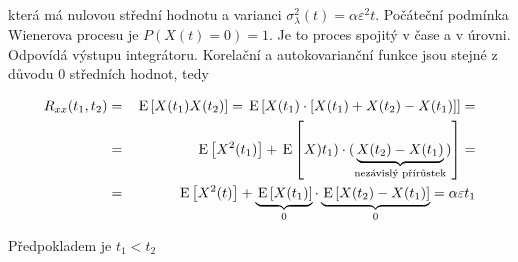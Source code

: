 která má nulovou střední hodnotu a varianci $\sigma^2_\lambda(t) = \alpha\varepsilon^2 t$. Počáteční podmínka Wienerova procesu je $P(X(t)=0)=1$. Je to proces spojitý v čase a v úrovni. Odpovídá výstupu integrátoru. Korelační a autokovarianční funkce jsou stejné z důvodu 0 středních hodnot, tedy

\begin{eqnarray*}
R_{xx}(t_1,t_2) &=&\,\mathrm{E}\left[X(t_1)X(t_2)\right] = \,\mathrm{E}\left[X(t_1)\cdot[X(t_1)+X(t_2)-X(t_1)]\right] = \\
& = & \,\mathrm{E}\left[X^2(t_1)\right] + \,\mathrm{E}\left[X)t_1)\cdot(\underbrace{X(t_2)-X(t_1)}_{\text{nezávislý přírůstek}})\right]= \\
& = & \,\mathrm{E}\left[X^2(t)\right]+\underbrace{\,\mathrm{E}\left[X(t_1)\right]}_0\cdot \underbrace{\,\mathrm{E}\left[X(t_2)-X(t_1)\right]}_0 = \alpha\varepsilon t_1
\end{eqnarray*}

Předpokladem je $t_1<t_2$
